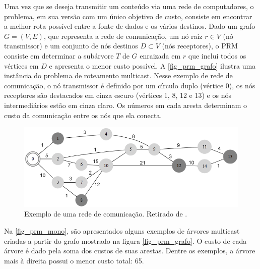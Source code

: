Uma vez que se deseja transmitir um conteúdo via uma rede de computadores, o problema, em sua versão com um único objetivo de custo, consiste em encontrar a melhor rota possível entre a fonte de dados e os vários destinos. Dado um grafo $G=(V,E)$, que representa a rede de comunicação, um nó raiz $r \in V$ (nó transmissor) e um conjunto de nós destinos $D \subset V$ (nós receptores), o PRM consiste em determinar a subárvore $T$ de $G$ enraizada em $r$ que inclui todos os vértices em $D$ e apresenta o menor custo possível. A \autoref{fig_prm_grafo} ilustra uma instância do problema de roteamento multicast. Nesse exemplo de rede de comunicação, o nó transmissor é definido por um círculo duplo (vértice 0), os nós receptores são destacados em cinza escuro (vértices 1, 8, 12 e 13) e os nós intermediários estão em cinza claro. Os números em cada aresta determinam o custo da comunicação entre os nós que ela conecta.

\begin{figure}[!htbp]
	\centering
	\includegraphics[width=1\textwidth]{cap_problemas/figs/prm_grafo}
	\caption{\label{fig_prm_grafo}Exemplo de uma rede de comunicação. Retirado de \cite{BuenoThesis}.}
\end{figure}

Na \autoref{fig_prm_mono}, são apresentados alguns exemplos de árvores multicast criadas a partir do grafo mostrado na figura \autoref{fig_prm_grafo}. O custo de cada árvore é dado pela soma dos custos de suas arestas. Dentre os exemplos, a árvore mais à direita possui o menor custo total: 65.

